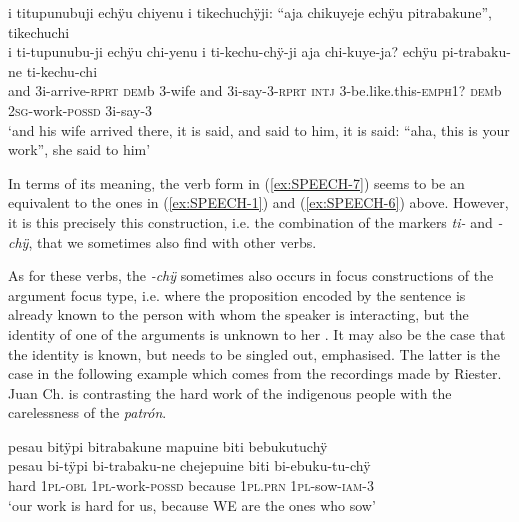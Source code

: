 \ea\label{ex:SPEECH-7}
\begingl
\glpreamble i titupunubuji echÿu chiyenu i tikechuchÿji: “aja chikuyeje echÿu pitrabakune”, tikechuchi\\
\gla i ti-tupunubu-ji echÿu chi-yenu i ti-kechu-chÿ-ji aja chi-kuye-ja? echÿu pi-trabaku-ne ti-kechu-chi\\
\glb and 3i-arrive-\textsc{rprt} \textsc{dem}b 3-wife and 3i-say-3-\textsc{rprt} \textsc{intj} 3-be.like.this-\textsc{emph}1? \textsc{dem}b 2\textsc{sg}-work-\textsc{possd} 3i-say-3\\
\glft ‘and his wife arrived there, it is said, and said to him, it is said: “aha, this is your work”, she said to him’
\endgl
\trailingcitation{[mox-n110920l.071-072]}
\xe

In terms of its meaning, the verb form in (\ref{ex:SPEECH-7}) seems to be an equivalent to the ones in (\ref{ex:SPEECH-1}) and (\ref{ex:SPEECH-6}) above. However, it is this precisely this construction, i.e. the combination of the markers \textit{ti-} and \textit{-chÿ}, that we sometimes also find with other verbs.

%


As for these verbs, the \textit{-chÿ} sometimes also occurs in focus constructions of the argument focus type, i.e. where the proposition encoded by the sentence is already known to the person with whom the speaker is interacting, but the identity of one of the arguments is unknown to her \citep[cf.][228]{Lambrecht1994}. It may also be the case that the identity is known, but needs to be singled out, emphasised. The latter is the case in the following example which comes from the recordings made by Riester. Juan Ch. is contrasting the hard work of the indigenous people with the carelessness of the \textit{patrón}.

\ea\label{ex:bichÿ}
\begingl
\glpreamble pesau bitÿpi bitrabakune mapuine biti bebukutuchÿ\\
\gla pesau bi-tÿpi bi-trabaku-ne chejepuine biti bi-ebuku-tu-chÿ\\
\glb hard 1\textsc{pl}-\textsc{obl} 1\textsc{pl}-work-\textsc{possd} because 1\textsc{pl.prn} 1\textsc{pl}-sow-\textsc{iam}-3\\
\glft ‘our work is hard for us, because WE are the ones who sow’
\endgl
\trailingcitation{[nxx-p630101g-1.088]}
\xe

